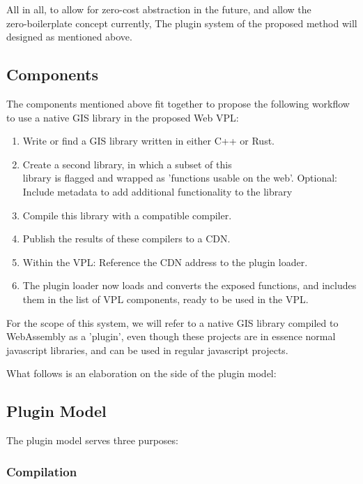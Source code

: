 All in all, to allow for zero-cost abstraction in the future, and allow the \\ zero-boilerplate
concept currently, The plugin system of the proposed method will designed as mentioned above. 

\subsection{Components}

The components mentioned above fit together to propose the following workflow to use a native GIS library in the proposed Web VPL: 
\begin{enumerate}
  \item Write or find a GIS library written in either C++ or Rust. 
  \item Create a second library, in which a subset of this \\ 
  library is flagged and wrapped as 'functions usable on the web'.
  \subitem Optional: Include metadata to add additional functionality to the library
  \item Compile this library with a compatible compiler.
  \item Publish the results of these compilers to a \ac{CDN}. 
  
  \item Within the VPL: Reference the CDN address to the plugin loader. 
  \item The plugin loader now loads and converts the exposed functions, and includes them in the list of VPL components, ready to be used in the VPL. 
\end{enumerate}

For the scope of this system, we will refer to a native GIS library compiled to \\ WebAssembly as a 'plugin', even though these projects are in essence normal javascript libraries, and can be used in regular javascript projects. 

What follows is an elaboration on the side of the plugin model:

\subsection{Plugin Model}

The plugin model serves three purposes:

\subsubsection{Compilation}

